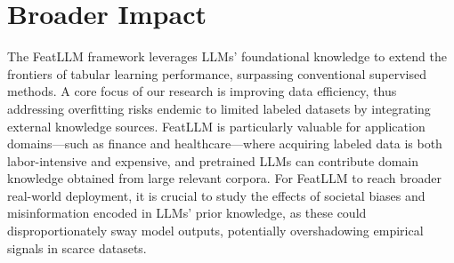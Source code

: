 \section{Broader Impact}
The \textsf{FeatLLM} framework leverages LLMs' foundational knowledge to extend the frontiers of tabular learning performance, surpassing conventional supervised methods. A core focus of our research is improving data efficiency, thus addressing overfitting risks endemic to limited labeled datasets by integrating external knowledge sources. \textsf{FeatLLM} is particularly valuable for application domains—such as finance and healthcare—where acquiring labeled data is both labor-intensive and expensive, and pretrained LLMs can contribute domain knowledge obtained from large relevant corpora. For \textsf{FeatLLM} to reach broader real-world deployment, it is crucial to study the effects of societal biases and misinformation encoded in LLMs’ prior knowledge, as these could disproportionately sway model outputs, potentially overshadowing empirical signals in scarce datasets.

